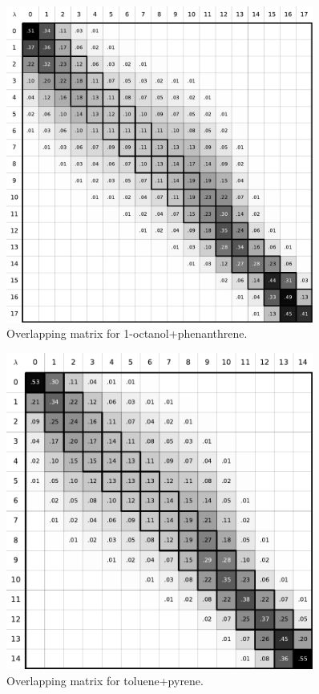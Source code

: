\documentclass[
	12pt,				%
	openany,			%
	oneside,			%
	a4paper,			%
	english,			%
	brazil				%
	]{abntex2}
\begin{document}
\begin{apendicesenv}
\begin{figure}[H]
	\centering
	\includegraphics[width=0.9\textwidth]{Figures/ooct_phen}
	\caption{Overlapping matrix for 1-octanol+phenanthrene.}
\end{figure}

\begin{figure}[H]
	\centering
	\includegraphics[width=0.9\textwidth]{Figures/otol_pyr}
	\caption{Overlapping matrix for toluene+pyrene.}
\end{figure}


\end{apendicesenv}
\end{document}
